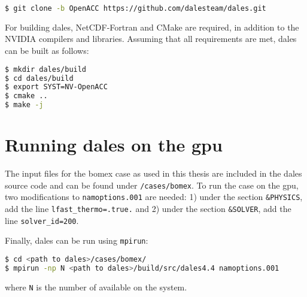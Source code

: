 \begin{lstlisting}[language=bash]
$ git clone -b OpenACC https://github.com/dalesteam/dales.git
\end{lstlisting}

For building \acrshort{dales}, NetCDF-Fortran and CMake are required, in addition to the NVIDIA compilers and libraries. Assuming that all requirements are met, \acrshort{dales} can be built as follows:

\begin{lstlisting}[language=bash, numbers=none]
$ mkdir dales/build
$ cd dales/build
$ export SYST=NV-OpenACC
$ cmake ..
$ make -j
\end{lstlisting}

\section{Running \acrshort{dales} on the \acrshort{gpu}}
The input files for the \acrshort{bomex} case as used in this thesis are included in the \acrshort{dales} source code and can be found under \texttt{/cases/bomex}. To run the case on the \acrshort{gpu}, two modifications to \texttt{namoptions.001} are needed: 1) under the section \texttt{\&PHYSICS}, add the line \texttt{lfast\_thermo=.true.} and 2) under the section \texttt{\&SOLVER}, add the line \texttt{solver\_id=200}.

Finally, \acrshort{dales} can be run using \texttt{mpirun}:

\begin{lstlisting}[language=bash, numbers=none]
$ cd <path to dales>/cases/bomex/
$ mpirun -np N <path to dales>/build/src/dales4.4 namoptions.001
\end{lstlisting}

where \texttt{N} is the number of  available on the system.